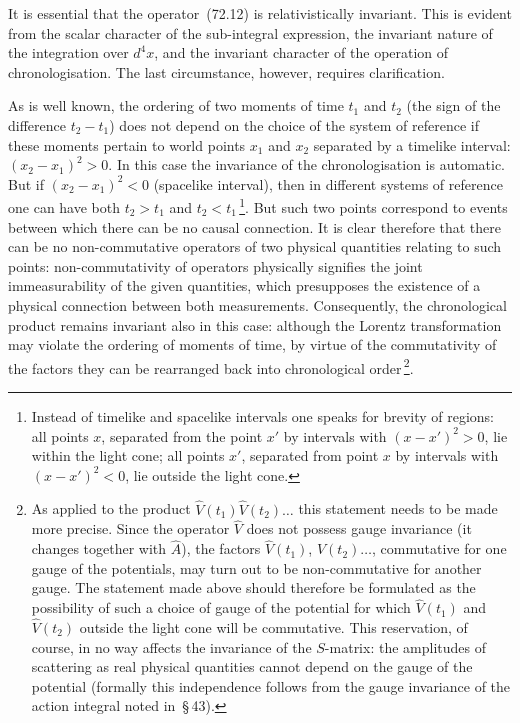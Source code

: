 It is essential that the operator~(72.12) is relativistically invariant. This is evident from the scalar character of the sub-integral expression, the invariant nature of the integration over $d^4x$, and the invariant character of the operation of chronologisation. The last circumstance, however, requires clarification.

As is well known, the ordering of two moments of time $t_1$ and $t_2$ (the sign of the difference $t_2 - t_1$) does not depend on the choice of the system of reference if these moments pertain to world points $x_1$ and $x_2$ separated by a timelike interval: $(x_2 - x_1)^2 > 0$. In this case the invariance of the chronologisation is automatic. But if $(x_2 - x_1)^2 < 0$ (spacelike interval), then in different systems of reference one can have both $t_2 > t_1$ and $t_2 < t_1$\,\footnote{Instead of timelike and spacelike intervals one speaks for brevity of regions: all points $x$, separated from the point $x'$ by intervals with $(x - x')^2 > 0$, lie within the light cone; all points $x'$, separated from point $x$ by intervals with $(x - x')^2 < 0$, lie outside the light cone.}. But such two points correspond to events between which there can be no causal connection. It is clear therefore that there can be no non-commutative operators of two physical quantities relating to such points: non-commutativity of operators physically signifies the joint immeasurability of the given quantities, which presupposes the existence of a physical connection between both measurements. Consequently, the chronological product remains invariant also in this case: although the Lorentz transformation may violate the ordering of moments of time, by virtue of the commutativity of the factors they can be rearranged back into chronological order\,\footnote{As applied to the product $\hat{V}(t_1)\hat{V}(t_2)\ldots$ this statement needs to be made more precise. Since the operator $\hat{V}$ does not possess gauge invariance (it changes together with $\hat{A}$), the factors $\hat{V}(t_1)$, $\hat{V}(t_2)\ldots$, commutative for one gauge of the potentials, may turn out to be non-commutative for another gauge. The statement made above should therefore be formulated as the possibility of such a choice of gauge of the potential for which $\hat{V}(t_1)$ and $\hat{V}(t_2)$ outside the light cone will be commutative. This reservation, of course, in no way affects the invariance of the $S$-matrix: the amplitudes of scattering as real physical quantities cannot depend on the gauge of the potential (formally this independence follows from the gauge invariance of the action integral noted in~\S\,43).}.

